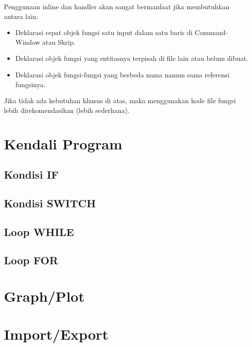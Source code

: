 \documentclass[12pt]{book}
\begin{document}
	Penggunaan inline dan handler akan sangat bermanfaat jika membutuhkan antara lain:
	\begin{itemize}
		\item Deklarasi cepat objek fungsi satu input dalam satu baris di Command-Window atau Skrip.
		\item Deklarasi objek fungsi yang entitasnya terpisah di file lain atau belum dibuat.
		\item Deklarasi objek fungsi-fungsi yang berbeda nama namun sama referensi fungsinya.
	\end{itemize}

	Jika tidak ada kebutuhan khusus di atas, maka menggunakan kode file fungsi lebih direkomendasikan (lebih sederhana). 
	
	\section{Kendali Program}
	
	\subsection{Kondisi IF}
	\subsection{Kondisi SWITCH}
	\subsection{Loop WHILE}
	\subsection{Loop FOR}
	
	\section{Graph/Plot}
	
	\section{Import/Export}
\end{document}
